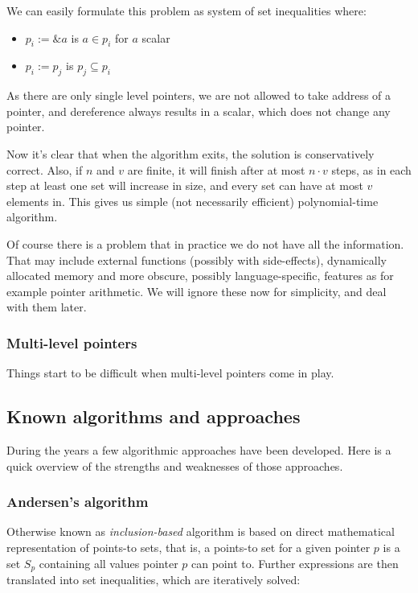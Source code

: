 We can easily formulate this problem as system of set inequalities where:

\begin{itemize}
	\item $p_i := \&a$ is $a \in p_i$ for $a$ scalar
	\item $p_i := p_j$ is $p_j \subseteq p_i$
\end{itemize}

As there are only single level pointers, we are not allowed to take address of a
pointer, and dereference always results in a scalar, which does not change any
pointer.

Now it's clear that when the algorithm exits, the solution is conservatively
correct. Also, if $n$ and $v$ are finite, it will finish after at most $n \cdot
v$ steps, as in each step at least one set will increase in size, and every set
can have at most $v$ elements in.
This gives us simple (not necessarily efficient) polynomial-time algorithm.

Of course there is a problem that in practice we  do not have all the information.
That may include external functions (possibly with side-effects), dynamically
allocated memory and more obscure, possibly language-specific, features as for
example pointer arithmetic. We will ignore these now for simplicity, and
deal with them later. 

\subsubsection{Multi-level pointers}

Things start to be difficult when multi-level pointers come in play. 

\subsection{Known algorithms and approaches}

During the years a few algorithmic approaches have been developed. Here is a
quick overview of the strengths and weaknesses of those approaches.

\subsubsection{Andersen's algorithm}

Otherwise known as {\it inclusion-based} algorithm is based on direct
mathematical representation of points-to sets, that is, a points-to set for a
given pointer $p$ is a set $S_p$ containing all values pointer $p$ can point to.
Further expressions are then translated into set inequalities, which are
iteratively solved:

